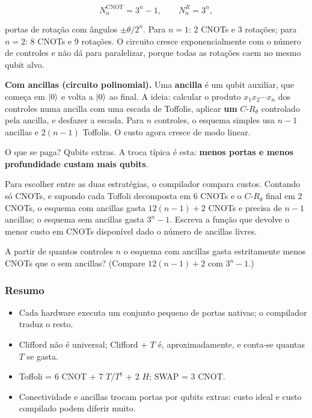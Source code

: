 \[
N^{\text{CNOT}}_n = 3^n - 1, \qquad N^{R}_n = 3^n ,
\]

portas de rotação com ângulos \(\pm\theta/2^n\). Para \(n=1\): 2 CNOTs e 3 rotações; para \(n=2\): 8 CNOTs e 9 rotações. O circuito cresce exponencialmente com o número de controles e não dá para paralelizar, porque todas as rotações caem no mesmo qubit alvo.

\textbf{Com ancillas (circuito polinomial).} Uma \textbf{ancilla} é um qubit auxiliar, que começa em \(\left|{0}\right>\) e volta a \(\left|{0}\right>\) ao final. A ideia: calcular o produto \(x_1x_2\cdots x_n\) dos controles numa ancilla com uma escada de Toffolis, aplicar \textbf{um} \(C\text{-}R_\theta\) controlado pela ancilla, e desfazer a escada. Para \(n\) controles, o esquema simples usa \(n-1\) ancillas e \(2(n-1)\) Toffolis. O custo agora cresce de modo linear.

O que se paga? Qubits extras. A troca típica é esta: \textbf{menos portas e menos profundidade custam mais qubits}.

Para escolher entre as duas estratégias, o compilador compara custos. Contando só CNOTs, e supondo cada Toffoli decomposta em 6 CNOTs e o \(C\text{-}R_\theta\) final em 2 CNOTs, o esquema com ancillas gasta \(12(n-1)+2\) CNOTs e precisa de \(n-1\) ancillas; o esquema sem ancillas gasta \(3^n-1\). Escreva a função que devolve o menor custo em CNOTs disponível dado o número de ancillas livres.

A partir de quantos controles \(n\) o esquema com ancillas gasta estritamente menos CNOTs que o sem ancillas? (Compare \(12(n-1)+2\) com \(3^n-1\).)

\subsubsection{Resumo}\label{resumo}

\begin{itemize}
\tightlist
\item
  Cada hardware executa um conjunto pequeno de portas nativas; o compilador traduz o resto.
\item
  Clifford não é universal; Clifford + \(T\) é, aproximadamente, e conta-se quantas \(T\) se gasta.
\item
  Toffoli = 6 CNOT + 7 \(T\)/\(T^\dagger\) + 2 \(H\); SWAP = 3 CNOT.
\item
  Conectividade e ancillas trocam portas por qubits extras: custo ideal e custo compilado podem diferir muito.
\end{itemize}

